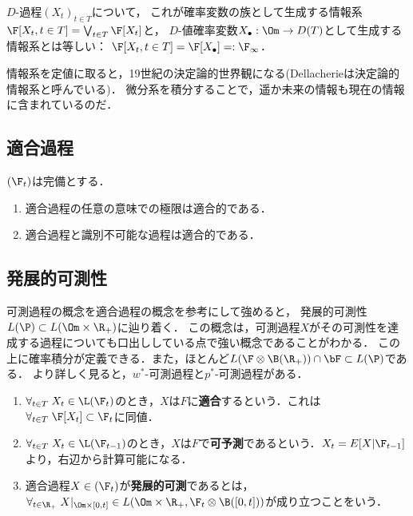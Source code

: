 \documentclass[uplatex,dvipdfmx]{jsreport}
\begin{document}
\begin{proposition}[$D$-過程が生成する情報系の特徴付け]
    $D$-過程$(X_t)_{t\in T}$について，
    これが確率変数の族として生成する情報系$\F[X_t,t\in T]=\bigvee_{t\in T}\F[X_t]$と，
    $D$-値確率変数$X_\bullet:\Om\to D(T)$として生成する情報系とは等しい：
    $\F[X_t,t\in T]=\F[X_\bullet]=:\F_\infty$．
\end{proposition}

\begin{remark}[増大情報系の哲学]
    情報系を定値に取ると，19世紀の決定論的世界観になる(Dellacherie\cite{Dellacherie-Meyer}は決定論的情報系と呼んでいる)．
    微分系を積分することで，遥か未来の情報も現在の情報に含まれているのだ．
\end{remark}

\subsection{適合過程}

\begin{proposition}
    $(\F_t)$は完備とする．
    \begin{enumerate}
        \item 適合過程の任意の意味での極限は適合的である．
        \item 適合過程と識別不可能な過程は適合的である．
    \end{enumerate}
\end{proposition}

\subsection{発展的可測性}

\begin{tcolorbox}[colframe=ForestGreen, colback=ForestGreen!10!white,breakable,colbacktitle=ForestGreen!40!white,coltitle=black,fonttitle=\bfseries\sffamily,
title=]
    可測過程の概念を適合過程の概念を参考にして強めると，
    発展的可測性$L(\P)\subset L(\Om\times\R_+)$に辿り着く．
    この概念は，可測過程$X$がその可測性を達成する過程についても口出ししている点で強い概念であることがわかる．
    この上に確率積分が定義できる．また，ほとんど$L(\F\otimes\B(\R_+))\cap\bF\subset L(\P)$である．
    より詳しく見ると，$w^*$-可測過程と$p^*$-可測過程がある．
\end{tcolorbox}

\begin{definition}\mbox{}
    \begin{enumerate}
        \item $\forall_{t\in T}\;X_t\in\L(\F_t)$のとき，$X$は$F$に\textbf{適合}するという．これは$\forall_{t\in T}\;\F[X_t]\subset\F_t$に同値．
        \item $\forall_{t\in T}\;X_t\in\L(\F_{t-1})$のとき，$X$は$F$で\textbf{可予測}であるという．$X_t=E[X|\F_{t-1}]$より，右辺から計算可能になる．
        \item 適合過程$X\in(\F_t)$が\textbf{発展的可測}であるとは，$\forall_{t\in\R_+}\;X|_{\Om\times[0,t]}\in L(\Om\times\R_+,\F_t\otimes\B([0,t]))$が成り立つことをいう．
    \end{enumerate}
\end{definition}
\end{document}
